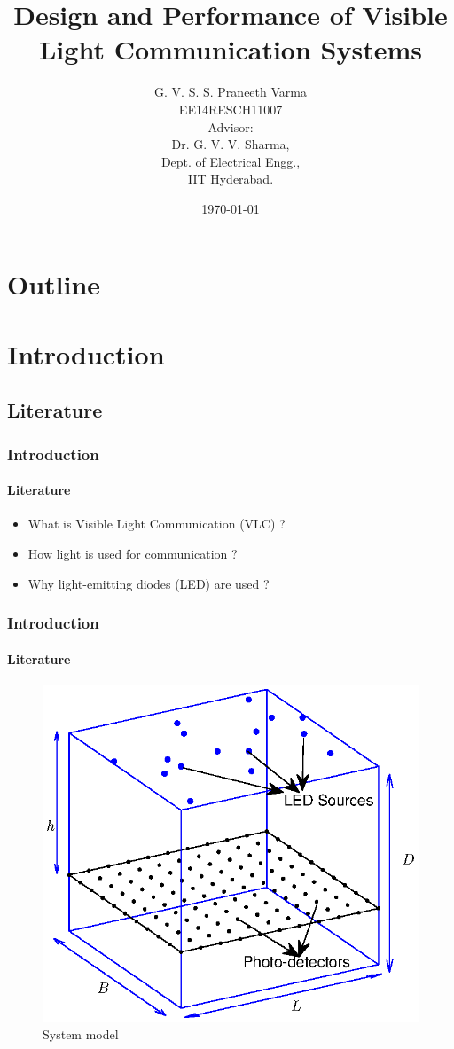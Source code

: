 \documentclass{beamer}
\title{Design and Performance of Visible Light Communication Systems}
\author{G. V. S. S. Praneeth Varma \\ EE14RESCH11007\\[1cm]{\small Advisor: \\ Dr. G. V. V. Sharma, \\ Dept. of Electrical Engg.,\\IIT Hyderabad.}}
\date{\today}
\theoremstyle{remark}
\begin{document}
\begin{frame}
\titlepage
\end{frame}

\section*{Outline}
\begin{frame}
\tableofcontents
\end{frame}
\section{Introduction}
\subsection{Literature}

\begin{frame}
\frametitle{Introduction}
\framesubtitle{Literature}
\begin{itemize}
\vfill
\item What is Visible Light Communication (VLC) ?
\vfill
\item How light is used for communication ?
\vfill
\item Why light-emitting diodes (LED) are used ?
\vfill
\end{itemize}
\end{frame}

\begin{frame}
\frametitle{Introduction}
\framesubtitle{Literature}
\begin{figure}
\centering
\includegraphics[width=.75\columnwidth]{3dmodel}
\caption{System model}
\label{fig:3dmodel}
\end{figure}
\vfill
\end{frame}
\end{document}

